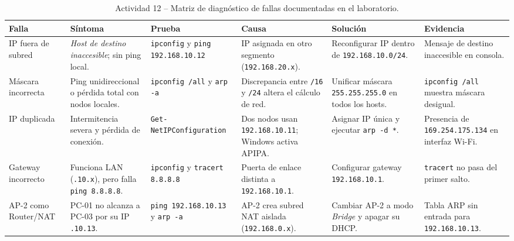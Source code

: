 \documentclass[11pt, a4paper]{article}
\begin{document}
\begin{table}[h!]
\centering
\footnotesize
\setlength{\tabcolsep}{3pt}
\caption{Actividad 12 -- Matriz de diagnóstico de fallas documentadas en el laboratorio.}
\begin{tabularx}{\textwidth}{>{\raggedright\arraybackslash}p{1.8cm} >{\raggedright\arraybackslash}p{2.2cm} >{\raggedright\arraybackslash}p{2.1cm} >{\raggedright\arraybackslash}p{2.6cm} >{\raggedright\arraybackslash}p{2.5cm} >{\raggedright\arraybackslash}X}
\toprule
\textbf{Falla} & \textbf{Síntoma} & \textbf{Prueba} & \textbf{Causa} & \textbf{Solución} & \textbf{Evidencia} \\
\midrule
IP fuera de subred & \textit{Host de destino inaccesible}; sin ping local. & \texttt{ipconfig} y \texttt{ping 192.168.10.12} & IP asignada en otro segmento (\texttt{192.168.20.x}). & Reconfigurar IP dentro de \texttt{192.168.10.0/24}. & Mensaje de destino inaccesible en consola. \\
\addlinespace
Máscara incorrecta & Ping unidireccional o pérdida total con nodos locales. & \texttt{ipconfig /all} y \texttt{arp -a} & Discrepancia entre \texttt{/16} y \texttt{/24} altera el cálculo de red. & Unificar máscara \texttt{255.255.255.0} en todos los hosts. & \texttt{ipconfig /all} muestra máscara desigual. \\
\addlinespace
IP duplicada & Intermitencia severa y pérdida de conexión. & \texttt{Get-NetIP\-Configuration} & Dos nodos usan \texttt{192.168.10.11}; Windows activa APIPA. & Asignar IP única y ejecutar \texttt{arp -d *}. & Presencia de \texttt{169.254.175.134} en interfaz Wi-Fi. \\
\addlinespace
Gateway incorrecto & Funciona LAN (\texttt{.10.x}), pero falla \texttt{ping 8.8.8.8}. & \texttt{ipconfig} y \texttt{tracert 8.8.8.8} & Puerta de enlace distinta a \texttt{192.168.10.1}. & Configurar gateway \texttt{192.168.10.1}. & \texttt{tracert} no pasa del primer salto. \\
\addlinespace
AP-2 como Router/NAT & PC-01 no alcanza a PC-03 por su IP \texttt{.10.13}. & \texttt{ping 192.168.10.13} y \texttt{arp -a} & AP-2 crea subred NAT aislada (\texttt{192.168.0.x}). & Cambiar AP-2 a modo \textit{Bridge} y apagar su DHCP. & Tabla ARP sin entrada para \texttt{192.168.10.13}. \\
\bottomrule
\end{tabularx}
\end{table}

\end{document}
